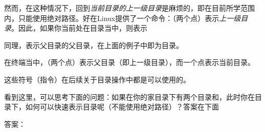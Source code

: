 然而，在这种情况下，回到\emph{当前目录的上一级目录}是麻烦的，即在目前所学范围内，只能使用绝对路径。好在Linux提供了一个命令：（两个点）表示\emph{上一级目录}。因此，如果你当前处在目录当中，则表示

同理，表示父目录的父目录，在上面的例子中即为目录。

\begin{attention}
    在终端当中，（两个点）表示父目录（即上一级目录），而一个点表示当前目录。

    这些符号（指令）在后续关于目录操作中都是可以使用的。
\end{attention}

看到这里，可以思考下面的问题：如果在你的家目录下有两个目录和，此时你在目录下，如何可以快速表示目录呢（不能使用绝对路径）？答案在下面

答案：